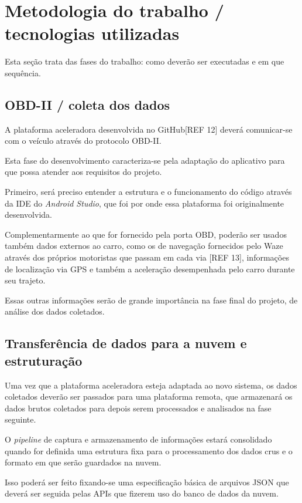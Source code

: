 \chapter{Metodologia do trabalho / tecnologias utilizadas}
\label{CAP3}

Esta seção trata das fases do trabalho: como deverão ser executadas e em que sequência.



\section{OBD-II / coleta dos dados}
A plataforma aceleradora desenvolvida no GitHub[REF 12] deverá comunicar-se com o veículo através do protocolo OBD-II.

Esta fase do desenvolvimento caracteriza-se pela adaptação do aplicativo para que possa atender aos requisitos do projeto.

Primeiro, será preciso entender a estrutura e o funcionamento do código através da IDE do \textit{Android Studio}, que foi por onde essa plataforma foi originalmente desenvolvida.

Complementarmente ao que for fornecido pela porta OBD, poderão ser usados também dados externos ao carro, como os de navegação fornecidos pelo Waze através dos próprios motoristas que passam em cada via [REF 13], informações de localização via GPS e também a aceleração desempenhada pelo carro durante seu trajeto.

Essas outras informações serão de grande importância na fase final do projeto, de análise dos dados coletados.

\section{Transferência de dados para a nuvem e estruturação}
Uma vez que a plataforma aceleradora esteja adaptada ao novo sistema, os dados coletados deverão ser passados para uma plataforma remota, que armazenará os dados brutos coletados para depois serem processados e analisados na fase seguinte.

O \textit{pipeline} de captura e armazenamento de informações estará consolidado quando for definida uma estrutura fixa para o processamento dos dados crus e o formato em que serão guardados na nuvem.

Isso poderá ser feito fixando-se uma especificação básica de arquivos JSON que deverá ser seguida pelas APIs que fizerem uso do banco de dados da nuvem.

